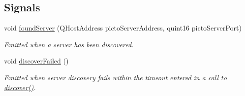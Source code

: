 \subsection*{Signals}
\begin{DoxyCompactItemize}
\item 
void \hyperlink{struct_picto_1_1_server_discoverer_a8ed031367a6678de3d6bb828f4523c6c}{found\-Server} (Q\-Host\-Address picto\-Server\-Address, quint16 picto\-Server\-Port)
\begin{DoxyCompactList}\small\item\em Emitted when a server has been discovered. \end{DoxyCompactList}\item 
\hypertarget{struct_picto_1_1_server_discoverer_ab1d51863b7e5ae6592385212e71df9b2}{void \hyperlink{struct_picto_1_1_server_discoverer_ab1d51863b7e5ae6592385212e71df9b2}{discover\-Failed} ()}\label{struct_picto_1_1_server_discoverer_ab1d51863b7e5ae6592385212e71df9b2}

\begin{DoxyCompactList}\small\item\em Emitted when server discovery fails within the timeout entered in a call to \hyperlink{struct_picto_1_1_server_discoverer_afdbfa7e1d36d540892d1fae30505ca42}{discover()}. \end{DoxyCompactList}\end{DoxyCompactItemize}
